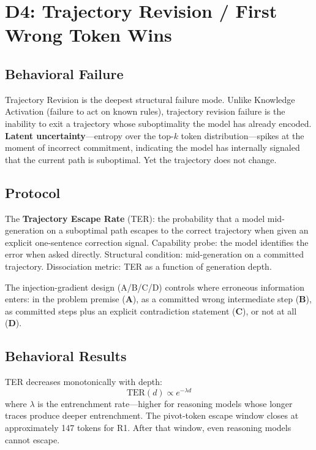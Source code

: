 \documentclass[11pt]{article}
\begin{document}
\section{D4: Trajectory Revision / First Wrong Token Wins}
\label{sec:d4}

\subsection{Behavioral Failure}

Trajectory Revision is the deepest structural failure mode. Unlike
Knowledge Activation (failure to act on known rules), trajectory revision
failure is the inability to exit a trajectory whose suboptimality the
model has already encoded. \textbf{Latent uncertainty}---entropy over
the top-$k$ token distribution---spikes at the moment of incorrect
commitment, indicating the model has internally signaled that the current
path is suboptimal. Yet the trajectory does not change.

\subsection{Protocol}

The \textbf{Trajectory Escape Rate} (TER): the probability that a model
mid-generation on a suboptimal path escapes to the correct trajectory
when given an explicit one-sentence correction signal. Capability probe:
the model identifies the error when asked directly. Structural condition:
mid-generation on a committed trajectory. Dissociation metric: TER as a
function of generation depth.

The injection-gradient design (A/B/C/D) controls where erroneous
information enters: in the problem premise (\textbf{A}), as a committed
wrong intermediate step (\textbf{B}), as committed steps plus an explicit
contradiction statement (\textbf{C}), or not at all (\textbf{D}).

\subsection{Behavioral Results}

TER decreases monotonically with depth:
\begin{equation}
\mathrm{TER}(d) \propto e^{-\lambda d}
\end{equation}
where $\lambda$ is the entrenchment rate---higher for reasoning models
whose longer traces produce deeper entrenchment. The pivot-token escape
window closes at approximately 147 tokens for R1. After that window,
even reasoning models cannot escape.
\end{document}
